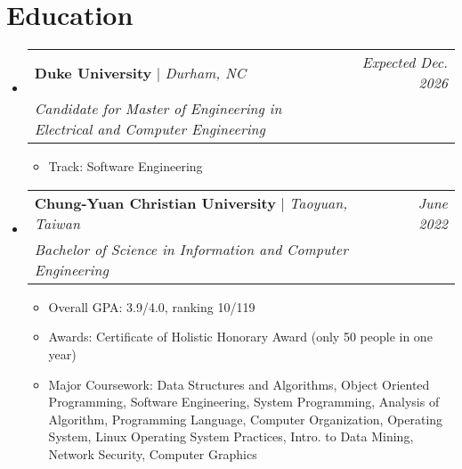 \documentclass[letterpaper,11pt]{article}
\makeatletter
\newcommand{\subheadingtitlevspace}{
\vspace{-3pt}
}
\newcommand{\resumeItem}[1]{
  \item{
    {#1}\vspace{-4pt}
  }
}
\newcommand{\resumeSubheading}[4]{
   \item
     \begin{tabular*}{0.97\textwidth}[t]{l@{\extracolsep{\fill}}r}
       \textbf{#1} | \emph{#2} & \textit{#4}\\
       \textit{#3} \\
     \end{tabular*}\vspace{-8pt}
 }
\newcommand{\resumeSubHeadingListStart}{\subheadingtitlevspace\begin{itemize}[leftmargin=0in, label={}]}
\newcommand{\resumeSubHeadingListEnd}{\end{itemize}}
\newcommand{\resumeItemListStart}{
\begin{itemize}[label={$\bullet$}, labelsep=8pt, itemsep=4pt]}
\newcommand{\resumeItemListEnd}{
\end{itemize}\vspace{-8pt}}
\makeatother
\begin{document}
\section{Education}
  \resumeSubHeadingListStart
    \resumeSubheading
      {Duke University}{Durham, NC}
      {Candidate for Master of Engineering in Electrical and Computer Engineering} 
      {Expected Dec. 2026} %
      \resumeItemListStart
        \resumeItem{Track: Software Engineering}
      \resumeItemListEnd
    \resumeSubheading
      {Chung-Yuan Christian University} {Taoyuan, Taiwan}
      {Bachelor of Science in Information and Computer Engineering} 
      {June 2022}
      \resumeItemListStart
        \resumeItem{Overall GPA: 3.9/4.0, ranking 10/119}
        \resumeItem{Awards: Certificate of Holistic Honorary Award (only 50 people in one year)}
        \resumeItem{Major Coursework: Data Structures and Algorithms, Object Oriented Programming, Software Engineering, System Programming, 
                    Analysis of Algorithm, Programming Language, Computer Organization, Operating System, Linux Operating System Practices, 
                    Intro. to Data Mining, Network Security, Computer Graphics} 
      \resumeItemListEnd
  \resumeSubHeadingListEnd

   
\end{document}
